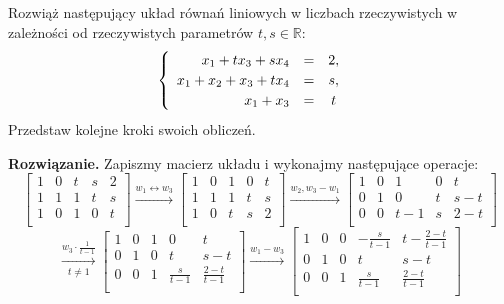 \documentclass[]{sinol}
\begin{document}
    \begin{zadanie}
        Rozwiąż następujący układ równań liniowych w liczbach rzeczywistych w zależności od rzeczywistych parametrów \(t, s \in \mathbb{R}\):
        \[
        \begin{cases}
        \begin{array}{ccc}
            \hfill x_1 + t x_3 + s x_4 & = & 2, \\
            \hfill x_1 + x_2 + x_3 + t x_4  & = & s, \\
            \hfill x_1 + x_3 & = & t \\  
        \end{array}
        
        \end{cases}
        \]
        Przedstaw kolejne kroki swoich obliczeń.

        \textbf{Rozwiązanie.}
        Zapiszmy macierz układu i wykonajmy następujące operacje:
        \[
        \begin{bmatrix}
            1 & 0 & t & s & 2 \\
            1 & 1 & 1 & t & s \\
            1 & 0 & 1 & 0 & t \\
        \end{bmatrix}
        \xrightarrow[]{w_1 \leftrightarrow w_3}
        \begin{bmatrix}
            1 & 0 & 1 & 0 & t \\
            1 & 1 & 1 & t & s \\
            1 & 0 & t & s & 2 \\
        \end{bmatrix}
        \xrightarrow[]{w_2, w_3 - w_1}
         \begin{bmatrix}
            1 & 0 & 1 & 0 & t \\
            0 & 1 & 0 & t & s-t \\
            0 & 0 & t-1 & s & 2-t \\
        \end{bmatrix}        
        \]
        \[
        \xrightarrow[t\neq1]{w_3 \cdot \frac{1}{t-1}}
        \begin{bmatrix}
            1 & 0 & 1 & 0 & t \\
            0 & 1 & 0 & t & s-t \\
            0 & 0 & 1 & \frac{s}{t-1} & \frac{2-t}{t-1} \\
        \end{bmatrix}
        \xrightarrow[]{w_1-w_3} 
        \begin{bmatrix}
            1 & 0 & 0 & -\frac{s}{t-1} & t - \frac{2-t}{t-1} \\
            0 & 1 & 0 & t & s-t \\
            0 & 0 & 1 & \frac{s}{t-1} & \frac{2-t}{t-1} \\
        \end{bmatrix}
        \]


\end{zadanie}
\end{document}
